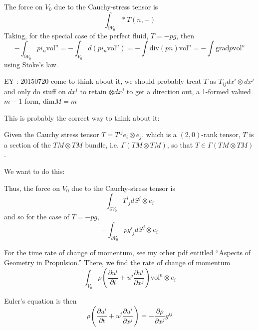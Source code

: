 \documentclass[twoside,landscape,10pt]{amsart}
\theoremstyle{plain}
\theoremstyle{definition}
\theoremstyle{remark}
\theoremstyle{remark}
\begin{document}
\begin{multicols*}{2}
The force on $V_0$ due to the Cauchy-stress tensor is 
\[
\int_{\partial V_0} *T(n,-)
\]
Taking, for the special case of the perfect fluid, $T = - pg$, then 
\[
- \int_{\partial V_0} pi_n\text{vol}^n = -\int_{V_0} d(pi_n\text{vol}^n) = - \int \text{div}(pn) \text{vol}^n = -\int \text{grad}p \text{vol}^n
\]
using Stoke's law.  

EY : 20150720 come to think about it, we should probably treat $T$ as $T_{ij} dx^i \otimes dx^j$ and only do stuff on $dx^i$ to retain $\otimes dx^j$ to get a direction out, a 1-formed valued $m-1$ form, $\text{dim}M=m$

This is probably the correct way to think about it:

Given the Cauchy stress tensor $T = T^{ij} e_i \otimes e_j$, which is a $(2,0)$-rank tensor, $T$ is a section of the $TM\otimes TM$ bundle, i.e. $\Gamma(TM \otimes TM)$, so that $T \in \Gamma(TM \otimes TM)$.  

We want to do this:


Thus, the force on $V_0$ due to the Cauchy-stress tensor is 
\[
\int_{\partial V_0} T^i_{\,\,j}dS^j\otimes e_i
\]
and so for the case of $T = -pg$, 
\[
-\int_{\partial V_0} p g^i_{\,\,j} dS^j \otimes e_i
\]

For the time rate of change of momentum, see my other pdf entitled ``Aspects of Geometry in Propulsion.''  There, we find the rate of change of momentum
\[
\int_{V_0} \rho \left( \frac{\partial u^i}{ \partial t} + u^j \frac{ \partial u^i}{ \partial x^j} \right) \text{vol}^n \otimes e_i
\]

Euler's equation is then
\begin{equation}
  \rho \left( \frac{\partial u^i}{ \partial t} + u^j \frac{ \partial u^i}{ \partial x^j} \right) = - \frac{ \partial \rho }{ \partial x^j}g^{ij} 
\end{equation}




\end{multicols*}
\end{document}
